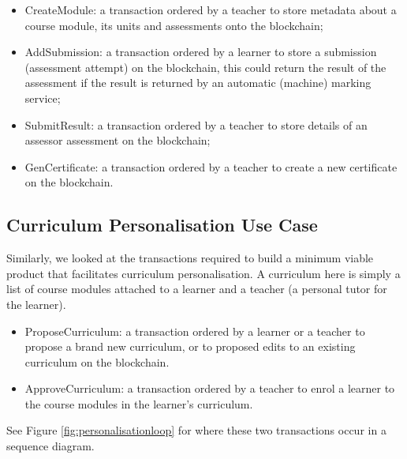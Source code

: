 \begin{itemize}
    \setlength\itemsep{0em}        
    \item CreateModule: a transaction ordered by a teacher to store metadata about a course module, 
    its units and assessments onto the blockchain;
    \item AddSubmission: a transaction ordered by a learner to store a submission (assessment attempt) 
    on the blockchain, this could return the result of the assessment if the result is returned by 
    an automatic (machine) marking service;
    \item SubmitResult: a transaction ordered by a teacher to store details of an assessor assessment 
    on the blockchain;
    \item GenCertificate: a transaction ordered by a teacher to create a new certificate on the blockchain.
\end{itemize}

\subsection{Curriculum Personalisation Use Case}

Similarly, we looked at the transactions required to build a minimum viable product 
that facilitates curriculum personalisation. A curriculum here is simply a list of course 
modules attached to a learner and a teacher (a personal tutor for the learner).

\begin{itemize}
    \setlength\itemsep{0em}            
    \item ProposeCurriculum: a transaction ordered by a learner or a teacher to propose 
    a brand new curriculum, or to proposed edits to an existing curriculum on the blockchain.
    \item ApproveCurriculum: a transaction ordered by a teacher to enrol a learner to 
    the course modules in the learner's curriculum.
\end{itemize}

See Figure \ref{fig:personalisationloop} for where these two transactions occur in a sequence diagram.

